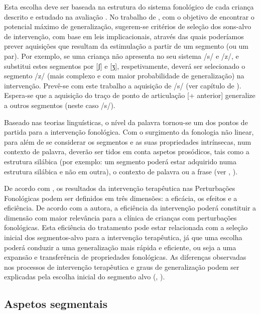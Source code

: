 \documentclass[output=paper,colorlinks,citecolor=brown,booklanguage=portuguese]{langscibook}
\begin{document}
Esta escolha deve ser baseada na estrutura do sistema fonológico de cada criança descrito e estudado na avaliação \citep{Mota2001, Lowe1996, StoelGammon2010, Alves2018, Elbert1986, Matzenauer2008}.
No trabalho de \citet{Elbert1986}, com o objetivo de encontrar o potencial máximo de generalização, sugerem-se critérios de seleção dos sons-alvo de intervenção, com base em leis implicacionais, através das quais poderíamos prever aquisições que resultam da estimulação a partir de um segmento (ou um par). Por exemplo, se uma criança não apresenta no seu sistema /s/ e /z/, e substitui estes segmentos por [ʃ] e [ʒ], respetivamente, deverá ser selecionado o segmento /z/ (mais complexo e com maior probabilidade de generalização) na intervenção. Prevê-se com este trabalho a aquisição de /s/ (ver capítulo de ). Espera-se que a aquisição do traço de ponto de articulação [+ anterior] generalize a outros segmentos (neste caso /s/).

Baseado nas teorias linguísticas, o nível da palavra tornou-se um dos pontos de partida para a intervenção fonológica. Com o surgimento da fonologia não linear, para além de se considerar os segmentos e as suas propriedades intrínsecas, num contexto de palavra, deverão ser tidos em conta aspetos prosódicos, tais como a estrutura silábica (por exemplo: um segmento poderá estar adquirido numa estrutura silábica e não em outra), o contexto de palavra ou a frase (ver , ). 

De acordo com \citet{Gierut2001}, os resultados da intervenção terapêutica nas Perturbações Fono\-lógicas podem ser definidos em três dimensões: a eficácia, os efeitos e a eficiência. De acordo com a autora, a eficiência da intervenção poderá constituir a dimensão com maior relevância para a clínica de crianças com perturbações fonológicas. Esta eficiência do tratamento pode estar relacionada com a seleção inicial dos segmentos-alvo para a intervenção terapêutica, já que uma escolha poderá conduzir a uma generalização mais rápida e eficiente, ou seja a uma expansão e transferência de propriedades fonológicas. As diferenças observadas nos processos de intervenção terapêutica e graus de generalização podem ser explicadas pela escolha inicial do segmento alvo (, \citealt{KeskeSoares2001, Duarte2006}).

\subsection{Aspetos segmentais}
\end{document}
